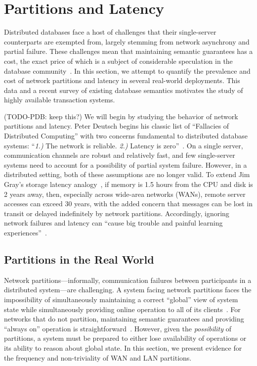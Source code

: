 
\section{Partitions and Latency}
\label{sec:motivation}

Distributed databases face a host of challenges that their
single-server counterparts are exempted from, largely stemming from
network asynchrony and partial failure. These challenges mean that
maintaining semantic guarantees has a cost, the exact price of which
is a subject of considerable speculation in the database
community~\cite{stonebraker2010errors}. In this section, we attempt to
quantify the prevalence and cost of network partitions and latency in
several real-world deployments. This data and a recent survey of
existing database semantics motivates the study of highly available
transaction systems.

(TODO-PDB: keep this?) We will begin by studying the behavior of
network partitions and latency. Peter Deutsch begins his classic list
of ``Fallacies of Distributed Computing'' with two concerns
fundamental to distributed database systems: ``\textit{1.)}  The
network is reliable. \textit{2.)} Latency is
zero''~\cite{fallacies-deutsch}. On a single server, communication
channels are robust and relatively fast, and few single-server systems
need to account for a possibility of partial system failure. However,
in a distributed setting, both of these assumptions are no longer
valid. To extend Jim Gray's storage latency analogy~\cite{gray-rules},
if memory is 1.5 hours from the CPU and disk is 2 years away, then,
especially across wide-area networks (WANs), remote server accesses
can exceed 30 years, with the added concern that messages can be lost
in transit or delayed indefinitely by network partitions. Accordingly,
ignoring network failures and latency can ``cause big trouble and
painful learning experiences''~\cite{fallacies-deutsch}.

\subsection{Partitions in the Real World}

Network partitions---informally, communication failures between
participants in a distributed system---are challenging. A system
facing network partitions faces the impossibility of simultaneously
maintaining a correct ``global'' view of system state while
simultaneously providing online operation to all of its
clients~\cite{davidson-survey}. For networks that do not partition,
maintaining semantic guarantees and providing ``always on'' operation
is straightforward~\cite{stonebraker2010errors}. However, given the
\textit{possibility} of partitions, a system must be prepared to
either lose availability of operations or its ability to reason about
global state. In this section, we present evidence for the frequency
and non-triviality of WAN and LAN partitions.


